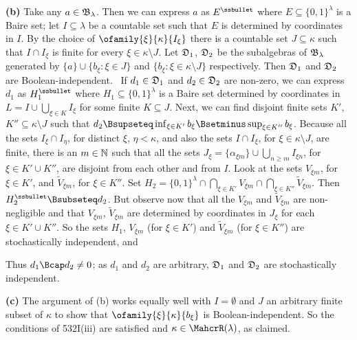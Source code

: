 {{\bf (b)} Take any $a\in\frak B_{\lambda}$.   Then we can express $a$ as
$E^{\ssbullet}$ where $E\subseteq\{0,1\}^{\lambda}$ is a Baire set;  let
$I\subseteq\lambda$ be a countable set such that $E$ is determined by
coordinates in $I$.   By the choice of $\ofamily{\xi}{\kappa}{I_{\xi}}$
there is a countable set $J\subseteq\kappa$ such that $I\cap I_{\xi}$ is
finite for every $\xi\in\kappa\setminus J$.   Let $\frak D_1$,
$\frak D_2$ be the subalgebras of $\frak B_{\lambda}$ generated by
$\{a\}\cup\{b_{\xi}:\xi\in J\}$ and
$\{b_{\xi}:\xi\in\kappa\setminus J\}$ respectively.   Then $\frak D_1$
and $\frak D_2$ are Boolean-independent.   \Prf\ If $d_1\in\frak D_1$
and $d_2\in\frak D_2$ are non-zero, we can express $d_1$ as
$H_1^{\ssbullet}$ where $H_1\subseteq\{0,1\}^{\lambda}$ is a Baire set
determined by coordinates in $L=I\cup\bigcup_{\xi\in K}I_{\xi}$ for some
finite $K\subseteq J$.   Next, we can find disjoint finite sets $K'$,
$K''\subseteq\kappa\setminus J$ such that
$d_2\Bsupseteq\inf_{\xi\in K'}b_{\xi}\Bsetminus\sup_{\xi\in K''}b_{\xi}$.
Because all the sets $I_{\xi}\cap I_{\eta}$, for distinct $\xi$,
$\eta<\kappa$, and also the sets $I\cap I_{\xi}$, for
$\xi\in\kappa\setminus J$, are finite, there is an $m\in\Bbb N$ such
that all the sets
$J_{\xi}=\{\alpha_{\xi m}\}\cup\bigcup_{n\ge m}I_{\xi n}$, for
$\xi\in K'\cup K''$, are disjoint from each other and from $I$.   Look
at the sets $V_{\xi m}$, for $\xi\in K'$, and $\tilde V_{\xi m}$,
for $\xi\in K''$.   Set
$H_2=\{0,1\}^{\lambda}\cap\bigcap_{\xi\in K'}V_{\xi m}
\cap\bigcap_{\xi\in K''}\tilde V_{\xi m}$.   Then
$H_2^{\ssbullet}\Bsubseteq d_2$.   But observe now that all the
$V_{\xi m}$ and $\tilde V_{\xi m}$ are non-negligible and that $V_{\xi m}$,
$\tilde V_{\xi m}$ are determined by coordinates in $J_{\xi}$ for each
$\xi\in K'\cup K''$.   So the sets $H_1$, $V_{\xi m}$ (for $\xi\in K'$)
and $\tilde V_{\xi m}$ (for $\xi\in K''$) are stochastically
independent, and


\noindent Thus $d_1\Bcap d_2\ne 0$;  as $d_1$ and $d_2$ are arbitrary,
$\frak D_1$ and $\frak D_2$ are stochastically independent.\ \Qed

\medskip

{\bf (c)} The argument of (b) works equally well with $I=\emptyset$
and $J$ an arbitrary
finite subset of $\kappa$ to show that $\ofamily{\xi}{\kappa}{b_{\xi}}$
is Boolean-independent.   So the conditions of 532I(iii) are satisfied
and $\kappa\in\MahcrR(\lambda)$, as claimed.
}%

